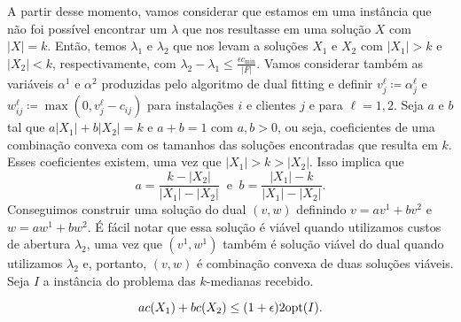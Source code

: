 A partir desse momento, vamos considerar que estamos em uma instância que não foi possível encontrar um $\lambda$ que nos resultasse em uma solução $X$ com $|X| = k$. Então, temos $\lambda_1$ e $\lambda_2$ que nos levam a soluções $X_1$ e $X_2$ com $|X_1| > k$ e $|X_2| < k$, respectivamente, com $\lambda_2 - \lambda_1 \leq \frac{\epsilon c_{\min}}{|F|}$. Vamos considerar também as variáveis $\alpha^1$ e $\alpha^2$ produzidas pelo algoritmo de dual fitting e definir $v_j^\ell \coloneqq \alpha_j^\ell$ e $w_{ij}^\ell \coloneqq \max(0,v_j^\ell - c_{ij})$ para instalações $i$ e clientes $j$ e para $\ell = 1,2$. Seja $a$ e $b$ tal que $a|X_1| + b|X_2| = k$ e $a + b = 1$ com $a,b>0$, ou seja, coeficientes de uma combinação convexa com os tamanhos das soluções encontradas que resulta em $k$. Esses coeficientes existem, uma vez que $|X_1| > k > |X_2|$. Isso implica que 
\[ a = \frac{k - |X_2|}{|X_1| - |X_2|} \ \text{ e }\ b = \frac{|X_1| - k}{|X_1| - |X_2|}.\]
Conseguimos construir uma solução do dual $(v,w)$ definindo ${v = av^1 + bv^2}$ e ${w = aw^1 + bw^2}$. É fácil notar que essa solução é viável quando utilizamos custos de abertura $\lambda_2$, uma vez que $(v^1,w^1)$ também é solução viável do dual quando utilizamos $\lambda_2$ e, portanto, $(v,w)$ é combinação convexa de duas soluções viáveis. Seja $I$ a instância do problema das $k$-medianas recebido. 
\begin{lemma}
    \label{k-median_relLag_lema1}
    \[ac(X_1) + bc(X_2) \leq (1+\epsilon) 2\mathrm{opt}(I).\]
\end{lemma}
